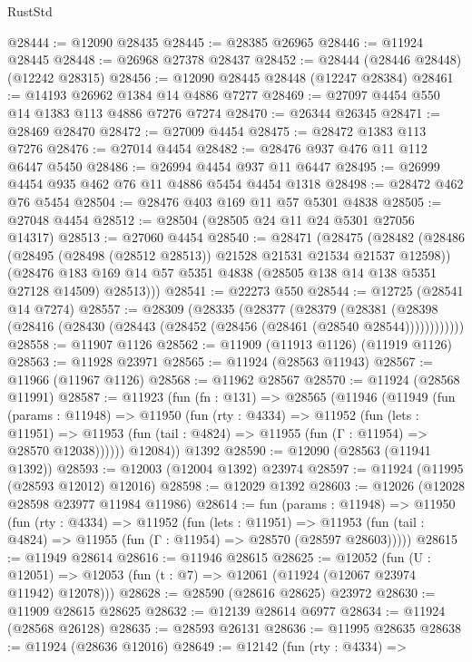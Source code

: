 \begin{lexlean}{RustStd}
\begin{coremodule}
@28444 := @12090 @28435
@28445 := @28385 @26965
@28446 := @11924 @28445
@28448 := @26968 @27378 @28437
@28452 := @28444 (@28446 @28448) (@12242 @28315)
@28456 := @12090 @28445 @28448 (@12247 @28384)
@28461 := @14193 @26962 @1384 @14 @4886 @7277
@28469 := @27097 @4454 @550 @14 @1383 @113 @4886 @7276 @7274
@28470 := @26344 @26345
@28471 := @28469 @28470
@28472 := @27009 @4454
@28475 := @28472 @1383 @113 @7276
@28476 := @27014 @4454
@28482 := @28476 @937 @476 @11 @112 @6447 @5450
@28486 := @26994 @4454 @937 @11 @6447
@28495 := @26999 @4454 @935 @462 @76 @11 @4886 @5454 @4454 @1318
@28498 := @28472 @462 @76 @5454
@28504 := @28476 @403 @169 @11 @57 @5301 @4838
@28505 := @27048 @4454
@28512 := @28504 (@28505 @24 @11 @24 @5301 @27056 @14317)
@28513 := @27060 @4454
@28540 := @28471
    (@28475
      (@28482
        (@28486 (@28495 (@28498 (@28512 @28513)) @21528 @21531 @21534 @21537 @12598))
        (@28476 @183 @169 @14 @57 @5351 @4838 (@28505 @138 @14 @138 @5351 @27128 @14509) @28513)))
@28541 := @22273 @550
@28544 := @12725 (@28541 @14 @7274)
@28557 := @28309
    (@28335
      (@28377
        (@28379
          (@28381 (@28398 (@28416 (@28430 (@28443 (@28452 (@28456 (@28461 (@28540 @28544))))))))))))
@28558 := @11907 @1126
@28562 := @11909 (@11913 @1126) (@11919 @1126)
@28563 := @11928 @23971
@28565 := @11924 (@28563 @11943)
@28567 := @11966 (@11967 @1126)
@28568 := @11962 @28567
@28570 := @11924 (@28568 @11991)
@28587 := @11923
    (fun (fn : @131) =>
    @28565
      (@11946
        (@11949
          (fun (params : @11948) =>
          @11950
            (fun (rty : @4334) =>
            @11952
              (fun (lets : @11951) =>
              @11953 (fun (tail : @4824) => @11955 (fun (Γ : @11954) => @28570 @12038))))))
        @12084))
    @1392
@28590 := @12090 (@28563 (@11941 @1392))
@28593 := @12003 (@12004 @1392) @23974
@28597 := @11924 (@11995 (@28593 @12012) @12016)
@28598 := @12029 @1392
@28603 := @12026 (@12028 @28598 @23977 @11984 @11986)
@28614 := fun (params : @11948) =>
  @11950
    (fun (rty : @4334) =>
    @11952
      (fun (lets : @11951) =>
      @11953 (fun (tail : @4824) => @11955 (fun (Γ : @11954) => @28570 (@28597 @28603)))))
@28615 := @11949 @28614
@28616 := @11946 @28615
@28625 := @12052
    (fun (U : @12051) => @12053 (fun (t : @7) => @12061 (@11924 (@12067 @23974 @11942) @12078)))
@28628 := @28590 (@28616 @28625) @23972
@28630 := @11909 @28615 @28625
@28632 := @12139 @28614 @6977
@28634 := @11924 (@28568 @26128)
@28635 := @28593 @26131
@28636 := @11995 @28635
@28638 := @11924 (@28636 @12016)
@28649 := @12142
    (fun (rty : @4334) =>

\end{coremodule}
\end{lexlean}
